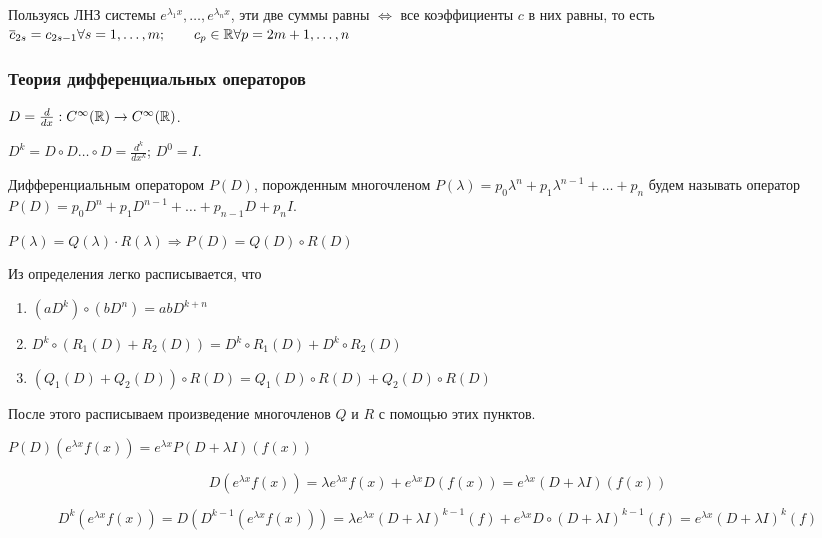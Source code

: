 Пользуясь ЛНЗ системы $e^{\lambda_1 x}, \dots, e^{\lambda_n x}$, эти две суммы равны $\iff$ все коэффициенты $c$ в них равны, то есть $\overline{c}_{2s} = c_{2s-1} \forall s=1,\dots,m; \qquad c_p \in \mathbb{R} \forall p=2m+1,\dots, n$

\Endproof

\subsubsection{Теория дифференциальных операторов}

\Def $D = \frac{d}{dx}: C^\infty(\mathbb{R}) \rightarrow C^\infty(\mathbb{R})$.

\Def $D^k = D \circ D \dots \circ D = \frac{d^k}{dx^k}$; $D^0 = I$.

\Def Дифференциальным оператором $P(D)$, порожденным многочленом $P(\lambda) = p_0\lambda^n + p_1 \lambda^{n-1} + \dots + p_n$ будем называть оператор $P(D) = p_0 D^n + p_1 D^{n-1} + \dots + p_{n-1} D + p_n I$.

\Lemma $P(\lambda) = Q(\lambda) \cdot R(\lambda) \Rightarrow P(D) = Q(D) \circ R(D)$

\Proof

Из определения легко расписывается, что

\begin{enumerate}
    \item $\left(aD^k\right) \circ \left(bD^n\right) = abD^{k+n}$
    \item $D^k \circ (R_1(D) + R_2(D)) = D^k \circ R_1(D) + D^k \circ R_2(D)$
    \item $(Q_1(D) + Q_2(D)) \circ R(D) = Q_1(D) \circ R(D) + Q_2(D) \circ R(D)$
\end{enumerate}

После этого расписываем произведение многочленов $Q$ и $R$ с помощью этих пунктов.

\Endproof

 $P(D)(e^{\lambda x}f(x)) = e^{\lambda x} P(D + \lambda I)(f(x))$

\Proof

\begin{equation*}
    D(e^{\lambda x} f(x)) = \lambda e^{\lambda x}f(x) + e^{\lambda x}D(f(x)) = e^{\lambda x}(D + \lambda I)(f(x))
\end{equation*}

\begin{equation*}
    D^k(e^{\lambda x} f(x)) = D(D^{k-1}(e^{\lambda x} f(x))) = \lambda e^{\lambda x} (D + \lambda I)^{k-1}(f) + e^{\lambda x} D \circ (D + \lambda I)^{k-1}(f) = e^{\lambda x}(D + \lambda I)^k (f)
\end{equation*}

